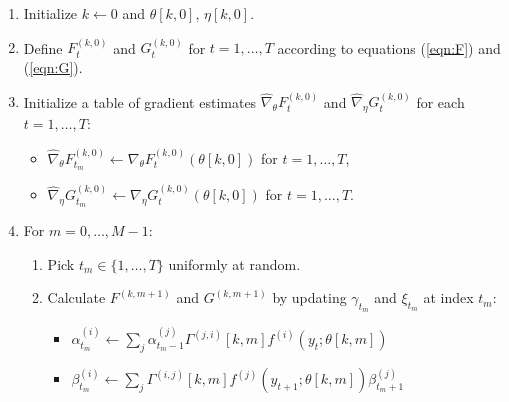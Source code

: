 
\begin{enumerate}
    \item Initialize $k \leftarrow 0$ and $\theta[k,0]$, $\eta[k,0]$.
    \item Define $F_t^{(k,0)}$ and $G_t^{(k,0)}$ for $t = 1, \ldots, T$ according to equations (\ref{eqn:F}) and (\ref{eqn:G}).
    \item Initialize a table of gradient estimates $\widehat \nabla_\theta F_t^{(k,0)}$ and $\widehat \nabla_\eta G_t^{(k,0)}$ for each $t = 1,\ldots,T$:
    \begin{itemize}
        \item $\widehat \nabla_\theta F_{t_m}^{(k,0)} \leftarrow \nabla_\theta F_{t}^{(k,0)}(\theta[k,0])$ for $t = 1,\ldots,T$,
        \item $\widehat \nabla_\eta G_{t_m}^{(k,0)} \leftarrow \nabla_\eta G_{t}^{(k,0)}(\theta[k,0])$ for $t = 1,\ldots,T$.
    \end{itemize}
    \item For $m = 0,\ldots,M-1$:
    \begin{enumerate}
        \item Pick $t_m \in \{1,\ldots,T\}$ uniformly at random.
        \item Calculate $F^{(k,m+1)}$ and $G^{(k,m+1)}$ by updating $\gamma_{t_m}$ and $\xi_{t_m}$ at index $t_m$:
        \begin{itemize}
            \item $\alpha^{(i)}_{t_m} \leftarrow \sum_j \alpha_{t_m-1}^{(j)} \Gamma^{(j,i)}[k,m] f^{(i)}(y_t;\theta[k,m])$
            \item $\beta^{(i)}_{t_m} \leftarrow \sum_j \Gamma^{(i,j)}[k,m] f^{(j)}(y_{t+1};\theta[k,m]) \beta_{t_m+1}^{(j)}$

\end{itemize}
\end{enumerate}
\end{enumerate}
